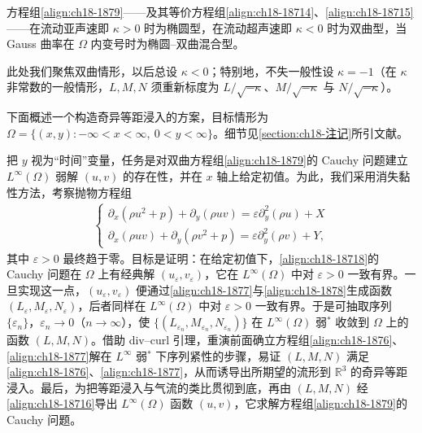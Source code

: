 \documentclass[../../main.tex]{subfiles}
\begin{document}
方程组\eqref{align:ch18-1879}——及其等价方程组\eqref{align:ch18-18714}、\eqref{align:ch18-18715}——在流动亚声速即 $\kappa>0$ 时为椭圆型，在流动超声速即 $\kappa<0$ 时为双曲型，当 Gauss 曲率在 $\Omega$ 内变号时为椭圆--双曲混合型。

此处我们聚焦双曲情形，以后总设 $\kappa<0$；特别地，不失一般性设 $\kappa=-1$（在 $\kappa$ 非常数的一般情形，$L,M,N$ 须重新标度为 $L/\sqrt{-\kappa}$、$M/\sqrt{-\kappa}$ 与 $N/\sqrt{-\kappa}$）。

下面概述一个构造奇异等距浸入的方案，目标情形为 $\Omega=\{(x,y):-\infty<x<\infty,\ 0<y<\infty\}$。细节见\cref{section:ch18-注记}所引文献。

把 $y$ 视为“时间”变量，任务是对双曲方程组\eqref{align:ch18-1879}的 Cauchy 问题建立 $L^\infty(\Omega)$ 弱解 $(u,v)$ 的存在性，并在 $x$ 轴上给定初值。为此，我们采用消失黏性方法，考察抛物方程组
\begin{align}
\begin{cases}
\partial_x(\rho u^2+p)+\partial_y(\rho uv)=\varepsilon\partial_y^2(\rho u)+X\\
\partial_x(\rho uv)+\partial_y(\rho v^2+p)=\varepsilon\partial_y^2(\rho v)+Y,
\end{cases}
\label{align:ch18-18718}
\end{align}
其中 $\varepsilon>0$ 最终趋于零。目标是证明：在给定初值下，\eqref{align:ch18-18718}的 Cauchy 问题在 $\Omega$ 上有经典解 $(u_\varepsilon,v_\varepsilon)$，它在 $L^\infty(\Omega)$ 中对 $\varepsilon>0$ 一致有界。一旦实现这一点，$(u_\varepsilon,v_\varepsilon)$ 便通过\eqref{align:ch18-1877}与\eqref{align:ch18-1878}生成函数 $(L_\varepsilon,M_\varepsilon,N_\varepsilon)$，后者同样在 $L^\infty(\Omega)$ 中对 $\varepsilon>0$ 一致有界。于是可抽取序列 $\{\varepsilon_n\}$，$\varepsilon_n\to0$（$n\to\infty$），使 $\{(L_{\varepsilon_n},M_{\varepsilon_n},N_{\varepsilon_n})\}$ 在 $L^\infty(\Omega)$ 弱$^*$ 收敛到 $\Omega$ 上的函数 $(L,M,N)$。借助 div--curl 引理，重演前面确立方程组\eqref{align:ch18-1876}、\eqref{align:ch18-1877}解在 $L^\infty$ 弱$^*$ 下序列紧性的步骤，易证 $(L,M,N)$ 满足\eqref{align:ch18-1876}、\eqref{align:ch18-1877}，从而诱导出所期望的流形到 $\mathbb{R}^3$ 的奇异等距浸入。最后，为把等距浸入与气流的类比贯彻到底，再由 $(L,M,N)$ 经\eqref{align:ch18-18716}导出 $L^\infty(\Omega)$ 函数 $(u,v)$，它求解方程组\eqref{align:ch18-1879}的 Cauchy 问题。
\end{document}
